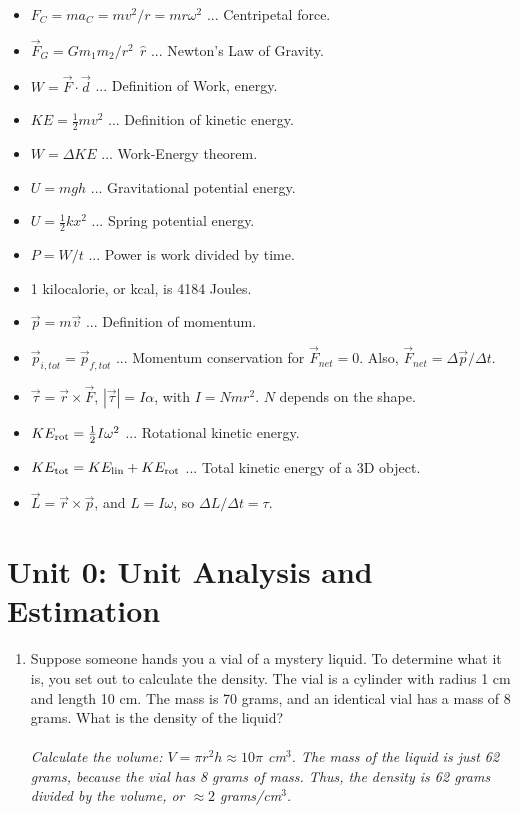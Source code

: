\documentclass[10pt]{article}
\begin{document}
\begin{itemize}
\item $F_C = m a_C = mv^2/r = mr\omega^2$ ... Centripetal force.
\item $\vec{F}_G = G m_1 m_2/r^2 ~~ \hat{r}$ ... Newton's Law of Gravity.
\item $W = \vec{F} \cdot \vec{d}$ ... Definition of Work, energy.
\item $KE = \frac{1}{2}mv^2$ ... Definition of kinetic energy.
\item $W = \Delta KE$ ... Work-Energy theorem.
\item $U = mgh$ ... Gravitational potential energy.
\item $U = \frac{1}{2}kx^2$ ... Spring potential energy.
\item $P = W/t$ ... Power is work divided by time.
\item 1 kilocalorie, or kcal, is 4184 Joules.
\item $\vec{p} = m\vec{v}$ ... Definition of momentum.
\item $\vec{p}_{i,tot} = \vec{p}_{f,tot}$ ... Momentum conservation for $\vec{F}_{net} = 0$.  Also, $\vec{F}_{net} = \Delta \vec{p} / \Delta t$.
\item $\vec{\tau} = \vec{r}\times \vec{F}$, $|\vec{\tau}| = I \alpha$, with $I = N m r^2$.  $N$ depends on the shape.
\item $KE_{\rm rot} = \frac{1}{2} I \omega^2$ ... Rotational kinetic energy.
\item $KE_{\rm tot} = KE_{\rm lin} + KE_{\rm rot}$ ... Total kinetic energy of a 3D object.
\item $\vec{L} = \vec{r} \times \vec{p}$, and $L = I\omega$, so $\Delta L/\Delta t = \tau$.
\end{itemize}

\section{Unit 0: Unit Analysis and Estimation}

\begin{enumerate}
\item Suppose someone hands you a vial of a mystery liquid.  To determine what it is, you set out to calculate the density.  The vial is a cylinder with radius 1 cm and length 10 cm.  The mass is 70 grams, and an identical vial has a mass of 8 grams.  What is the density of the liquid? \\ \\
\textit{Calculate the volume: $V = \pi r^2 h \approx 10\pi$ cm$^3$.  The mass of the liquid is just 62 grams, because the vial has 8 grams of mass.  Thus, the density is 62 grams divided by the volume, or $\approx 2$ grams/cm$^3$.}
\end{enumerate}
\end{document}
